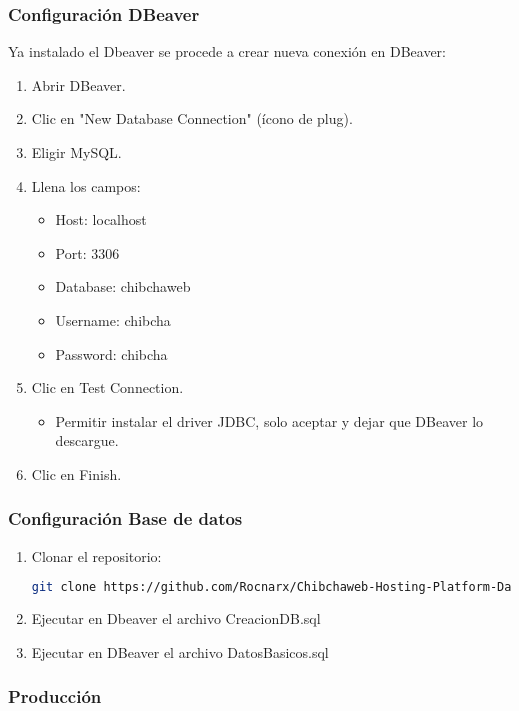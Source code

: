 \subsubsection*{Configuración DBeaver}
Ya instalado el Dbeaver se procede a crear nueva conexión en DBeaver:
\begin{enumerate}
\item Abrir DBeaver.
\item Clic en "New Database Connection" (ícono de plug).
\item Eligir MySQL.
\item Llena los campos:
    \begin{itemize}
    \item Host:	localhost
    \item Port:	3306
    \item Database:	chibchaweb
    \item Username:	chibcha
    \item Password:	chibcha
    \end{itemize}
\item Clic en Test Connection.
    \begin{itemize}
	\item Permitir instalar el driver JDBC, solo aceptar y dejar que DBeaver lo descargue.
    \end{itemize}
\item Clic en Finish.
\end{enumerate}

\subsubsection*{Configuración Base de datos}
\begin{enumerate}
	\item Clonar el repositorio:
	\begin{lstlisting}[language=bash]
git clone https://github.com/Rocnarx/Chibchaweb-Hosting-Platform-Database.git
    \end{lstlisting}
     \item Ejecutar en Dbeaver el archivo CreacionDB.sql
     \item Ejecutar en DBeaver el archivo DatosBasicos.sql

\end{enumerate}
\subsubsection{Producción}


